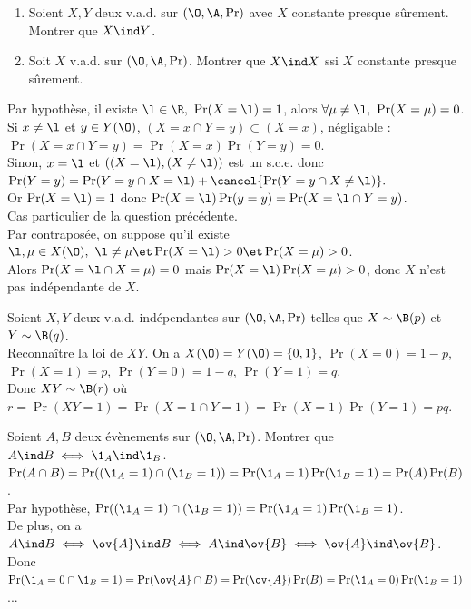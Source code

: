 \documentclass[11pt]{article}
\begin{document}
\begin{exercice}{}{}
    \begin{enumerate}
        \item Soient $X,Y$ deux v.a.d. sur $(\O,\A,\Pr)$ avec $X$ constante presque sûrement. Montrer que $X\ind Y$.
        \item Soit $X$ v.a.d. sur $(\O,\A,\Pr)$. Montrer que $X\ind X$ ssi $X$ constante presque sûrement.
    \end{enumerate}
    \tcblower
     Par hypothèse, il existe $\l\in\R, ~ \Pr(X=\l)=1$, alors $\forall \mu \neq \l, ~ \Pr(X=\mu)=0$.\\
    Si $x\neq\l$ et $y\in Y(\O)$, $(X=x\cap Y=y) \subset (X=x)$, négligable : $\Pr(X=x\cap Y=y)=\Pr(X=x)\Pr(Y=y)=0$.\\
    Sinon, $x=\l$ et $\left((X=\l),(X\neq\l)\right)$ est un s.c.e. donc $\Pr(Y=y)=\Pr(Y=y\cap X=\l)+\cancel{\Pr(Y=y\cap X\neq \l)}.$\\
    Or $\Pr(X=\l)=1$ donc $\Pr(X=\l)\Pr(y=y)=\Pr(X=\l\cap Y=y)$.\\
     Cas particulier de la question précédente.\\
     Par contraposée, on suppose qu'il existe $\l,\mu\in X(\O), ~ \l \neq \mu \et \Pr(X=\l)>0\et \Pr(X=\mu)>0$.\\
    Alors $\Pr(X=\l\cap X=\mu)=0$ mais $\Pr(X=\l)\Pr(X=\mu)>0$, donc $X$ n'est pas indépendante de $X$.
\end{exercice}

\vspace*{-0.9cm}

\begin{exercice}{}{}
    Soient $X,Y$ deux v.a.d. indépendantes sur $(\O,\A,\Pr)$ telles que $X\sim\B(p)$ et $Y\sim\B(q)$.\\
    Reconnaître la loi de $XY$.
    \tcblower
    On a $X(\O)=Y(\O)=\{0,1\}$, $\Pr(X=0)=1-p$, $\Pr(X=1)=p$, $\Pr(Y=0)=1-q$, $\Pr(Y=1)=q$.\\
    Donc $XY\sim\B(r)$ où $r=\Pr(XY=1)=\Pr(X=1\cap Y=1)=\Pr(X=1)\Pr(Y=1)=pq$.
\end{exercice}

\vspace*{-0.9cm}

\begin{exercice}{}{}
    Soient $A,B$ deux évènements sur $(\O,\A,\Pr)$. Montrer que $A\ind B \iff \1_A \ind \1_B$.
    \tcblower
    \boxed{\la} $\Pr(A\cap B)=\Pr((\1_A = 1) \cap (\1_B = 1))=\Pr(\1_A=1)\Pr(\1_B=1)=\Pr(A)\Pr(B)$.\\
    \boxed{\ra} Par hypothèse, $\Pr((\1_A = 1) \cap (\1_B = 1))=\Pr(\1_A=1)\Pr(\1_B=1)$.\\
    De plus, on a $A\ind B \iff \ov{A}\ind B \iff A \ind \ov{B} \iff \ov{A} \ind \ov{B}$.\\
    Donc $\Pr(\1_A = 0 \cap \1_B = 1) = \Pr(\ov{A}\cap B) = \Pr(\ov{A})\Pr(B) = \Pr(\1_A = 0)\Pr(\1_B=1)$...
\end{exercice}
\end{document}
